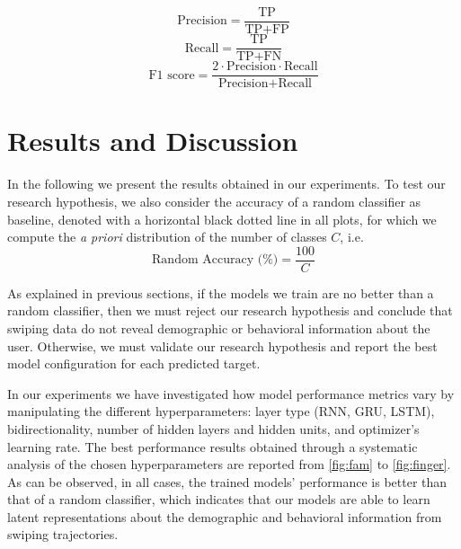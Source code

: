 \documentclass[sn-mathphys, pdflatex]{sn-jnl}
\begin{document}
\begin{equation}\label{eq:precision}
    \text{Precision} = \frac{\text{TP}}{\text{TP} + \text{FP}}
\end{equation}
\begin{equation}\label{eq:recall}
    \text{Recall} = \frac{\text{TP}}{\text{TP} + \text{FN}}
\end{equation}
\begin{equation}\label{eq:fscore}
    \text{F1 score}=  \frac{2 \cdot \text{Precision} \cdot \text{Recall}}{\text{Precision} + \text{Recall}}
\end{equation}

\section{Results and Discussion}

In the following we present the results obtained in our experiments.
To test our research hypothesis, we also consider the accuracy of a random classifier as baseline,
denoted with a horizontal black dotted line in all plots,
for which we compute the \emph{a priori} distribution of the number of classes $C$, i.e.
\begin{equation}
    \text{Random Accuracy (\%)} = \frac{100}{C}
\end{equation}

As explained in previous sections, if the models we train are no better than a random classifier,
then we must reject our research hypothesis and conclude that swiping data do not reveal demographic or behavioral information about the user.
Otherwise, we must validate our research hypothesis and report the best model configuration for each predicted target.

In our experiments we have investigated how model performance metrics vary
by manipulating the different hyperparameters: layer type (RNN, GRU, LSTM), bidirectionality, number of hidden layers and hidden units, and optimizer's learning rate.
The best performance results obtained through a systematic analysis of the chosen hyperparameters
are reported from \autoref{fig:fam} to \autoref{fig:finger}.
As can be observed, in all cases, the trained models' performance is better than that of a random classifier,
which indicates that our models are able to learn latent representations
about the demographic and behavioral information from swiping trajectories.
\end{document}
